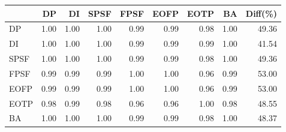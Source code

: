 \begin{tabular}{l|rrrrrrr|r}
\toprule
 & DP & DI & SPSF & FPSF & EOFP & EOTP & BA & Diff(\%)  \\
\midrule
DP & 1.00 & 1.00 & 1.00 & 0.99 & 0.99 & 0.98 & 1.00 & 49.36  \\
DI & 1.00 & 1.00 & 1.00 & 0.99 & 0.99 & 0.99 & 1.00 & 41.54  \\
SPSF & 1.00 & 1.00 & 1.00 & 0.99 & 0.99 & 0.98 & 1.00 & 49.36  \\
FPSF & 0.99 & 0.99 & 0.99 & 1.00 & 1.00 & 0.96 & 0.99 & 53.00  \\
EOFP & 0.99 & 0.99 & 0.99 & 1.00 & 1.00 & 0.96 & 0.99 & 53.00  \\
EOTP & 0.98 & 0.99 & 0.98 & 0.96 & 0.96 & 1.00 & 0.98 & 48.55  \\
BA & 1.00 & 1.00 & 1.00 & 0.99 & 0.99 & 0.98 & 1.00 & 48.37  \\
\bottomrule
\end{tabular}

